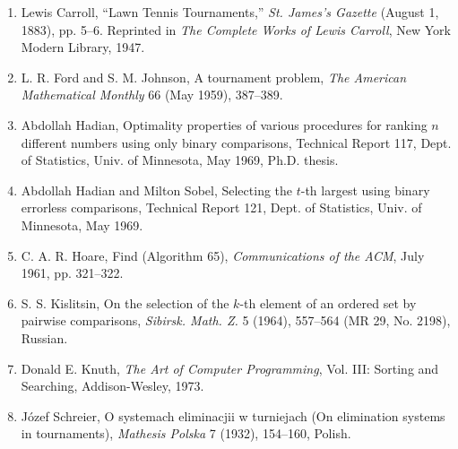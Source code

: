 \documentclass[11pt]{article}
\begin{document}
\begin{enumerate}
  \item Lewis Carroll, ``Lawn Tennis Tournaments,'' \textit{St. James's Gazette}
  (August 1, 1883), pp. 5--6. Reprinted in \textit{The Complete Works of Lewis
  Carroll}, New York Modern Library, 1947.
  \item L. R. Ford and S. M. Johnson, A tournament problem, \textit{The American
  Mathematical Monthly} 66 (May 1959), 387--389.
  \item Abdollah Hadian, Optimality properties of various procedures for ranking
  \(n\) different numbers using only binary comparisons, Technical Report 117,
  Dept. of Statistics, Univ. of Minnesota, May 1969, Ph.D. thesis.
  \item Abdollah Hadian and Milton Sobel, Selecting the \(t\)-th largest using
  binary errorless comparisons, Technical Report 121, Dept. of Statistics, Univ.
  of Minnesota, May 1969.
  \item C. A. R. Hoare, Find (Algorithm 65), \textit{Communications of the ACM},
  July 1961, pp. 321--322.
  \item S. S. Kislitsin, On the selection of the \(k\)-th element of an ordered
  set by pairwise comparisons, \textit{Sibirsk. Math. Z.} 5 (1964), 557--564
  (MR 29, No. 2198), Russian.
  \item Donald E. Knuth, \textit{The Art of Computer Programming}, Vol. III:
  Sorting and Searching, Addison-Wesley, 1973.
  \item Józef Schreier, O systemach eliminacjii w turniejach (On elimination
  systems in tournaments), \textit{Mathesis Polska} 7 (1932), 154--160, Polish.
\end{enumerate}
\end{document}
